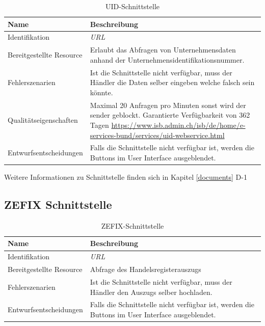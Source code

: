 \begin{table}[H]
	\centering
	\caption{UID-Schnittstelle}
	\begin{tabular}{ | p{4cm} | p{11cm} | }
		\toprule
		{\textbf{Name}} & {\textbf{Beschreibung}} \\
		\midrule
		Identifikation & \textit{\gls{URL}}\\ \hline
		Bereitgestellte Resource & Erlaubt das Abfragen von Unternehmensdaten anhand der Unternehmensidentifikationsnummer. \\ \hline
		Fehlerszenarien & Ist die Schnittstelle nicht verfügbar, muss der Händler die Daten selber eingeben welche falsch sein könnte.\\ \hline
		Qualitätseigenschaften & Maximal 20 Anfragen pro Minuten sonst wird der sender geblockt.  Garantierte Verfügbarkeit von 362 Tagen \url{https://www.isb.admin.ch/isb/de/home/e-services-bund/services/uid-webservice.html}\\ \hline
		Entwurfsentscheidungen & Falls die Schnittstelle nicht verfügbar ist, werden die Buttons im User Interface ausgeblendet.\\
		\bottomrule
	\end{tabular}
\end{table}

Weitere Informationen zu Schnittstelle finden sich in Kapitel \ref{documents} D-1

\subsection{ZEFIX Schnittstelle}

\begin{table}[H]
	\centering
	\caption{ZEFIX-Schnittstelle}
	\begin{tabular}{  | p{4cm} | p{11cm} | }
		\toprule
		{\textbf{Name}} & {\textbf{Beschreibung}} \\
		\midrule
		Identifikation & \textit{\gls{URL}}\\ \hline
		Bereitgestellte Resource & Abfrage des Handelsregisterauszugs \\ \hline
		Fehlerszenarien & Ist die Schnittstelle nicht verfügbar, muss der Händler den Auszugs selber hochladen.\\ \hline
		Entwurfsentscheidungen & Falls die Schnittstelle nicht verfügbar ist, werden die Buttons im User Interface ausgeblendet.\\
		\bottomrule
	\end{tabular}
\end{table}

